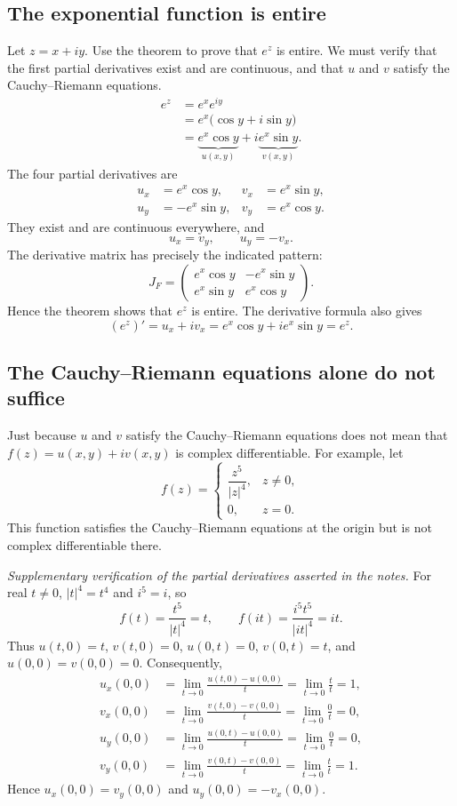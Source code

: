 \documentclass[11pt]{article}
\begin{document}
\subsection{The exponential function is entire}
Let $z=x+iy$. Use the theorem to prove that $e^z$ is entire. We must
verify that the first partial derivatives exist and are continuous, and
that $u$ and $v$ satisfy the Cauchy--Riemann equations.
\begin{align*}
 e^z&=e^x e^{iy}\\
 &=e^x\bigl(\cos y+i\sin y\bigr)\\
 &=\underbrace{e^x\cos y}_{u(x,y)}
   +i\underbrace{e^x\sin y}_{v(x,y)}.
\end{align*}
The four partial derivatives are
\begin{align*}
 u_x&=e^x\cos y,&v_x&=e^x\sin y,\\
 u_y&=-e^x\sin y,&v_y&=e^x\cos y.
\end{align*}
They exist and are continuous everywhere, and
\[
 u_x=v_y,\qquad u_y=-v_x.
\]
The derivative matrix has precisely the indicated pattern:
\[
 J_F=\begin{pmatrix}
 e^x\cos y&-e^x\sin y\\
 e^x\sin y&e^x\cos y
 \end{pmatrix}.
\]
Hence the theorem shows that $e^z$ is entire. The derivative formula also gives
\[
 (e^z)'=u_x+iv_x=e^x\cos y+ie^x\sin y=e^z.
\]

\subsection{The Cauchy--Riemann equations alone do not suffice}
Just because $u$ and $v$ satisfy the Cauchy--Riemann equations does not
mean that $f(z)=u(x,y)+iv(x,y)$ is complex differentiable. For example, let
\[
 f(z)=\begin{cases}
 \dfrac{z^5}{|z|^4},&z\ne0,\\[0.6em]
 0,&z=0.
 \end{cases}
\]
This function satisfies the Cauchy--Riemann equations at the origin but
is not complex differentiable there.

\textit{Supplementary verification of the partial derivatives asserted
in the notes.} For real $t\ne0$, $|t|^4=t^4$ and $i^5=i$, so
\[
 f(t)=\frac{t^5}{|t|^4}=t,\qquad
 f(it)=\frac{i^5t^5}{|it|^4}=it.
\]
Thus $u(t,0)=t$, $v(t,0)=0$, $u(0,t)=0$, $v(0,t)=t$, and
$u(0,0)=v(0,0)=0$. Consequently,
\begin{align*}
 u_x(0,0)&=\lim_{t\to0}\frac{u(t,0)-u(0,0)}t
 =\lim_{t\to0}\frac tt=1,\\
 v_x(0,0)&=\lim_{t\to0}\frac{v(t,0)-v(0,0)}t
 =\lim_{t\to0}\frac0t=0,\\
 u_y(0,0)&=\lim_{t\to0}\frac{u(0,t)-u(0,0)}t
 =\lim_{t\to0}\frac0t=0,\\
 v_y(0,0)&=\lim_{t\to0}\frac{v(0,t)-v(0,0)}t
 =\lim_{t\to0}\frac tt=1.
\end{align*}
Hence $u_x(0,0)=v_y(0,0)$ and $u_y(0,0)=-v_x(0,0)$.
\end{document}
